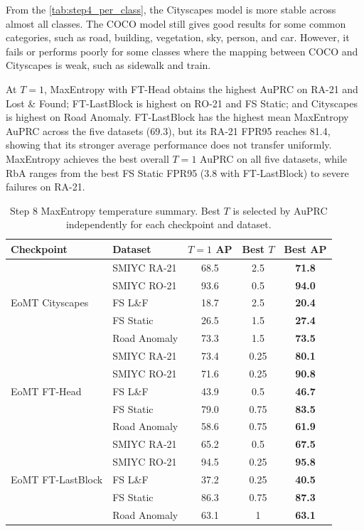 \documentclass[10pt,twocolumn,letterpaper]{article}
\begin{document}
From the \cref{tab:step4_per_class}, the Cityscapes model is more stable across almost all classes. The COCO model still gives good results for some common categories, such as road, building, vegetation, sky, person, and car. However, it fails or performs poorly for some classes where the mapping between COCO and Cityscapes is weak, such as sidewalk and train.

At $T=1$, MaxEntropy with FT-Head obtains the highest AuPRC on RA-21 and Lost \& Found; FT-LastBlock is highest on RO-21 and FS Static; and Cityscapes is highest on Road Anomaly. FT-LastBlock has the highest mean MaxEntropy AuPRC across the five datasets (69.3), but its RA-21 FPR95 reaches 81.4, showing that its stronger average performance does not transfer uniformly. MaxEntropy achieves the best overall $T=1$ AuPRC on all five datasets, while RbA ranges from the best FS Static FPR95 (3.8 with FT-LastBlock) to severe failures on RA-21.

\begin{table}[t]
\centering
\caption{Step 8 MaxEntropy temperature summary. Best $T$ is selected by AuPRC independently for each checkpoint and dataset.}
\label{tab:temperature_results}
\setlength{\tabcolsep}{3pt}
\scriptsize
\begin{tabular}{llccc}
\toprule
Checkpoint & Dataset & $T{=}1$ AP & Best $T$ & Best AP \\
\midrule
 & SMIYC RA-21 & 68.5 & 2.5 & \textbf{71.8} \\
 & SMIYC RO-21 & 93.6 & 0.5 & \textbf{94.0} \\
 EoMT Cityscapes & FS L\&F & 18.7 & 2.5 & \textbf{20.4} \\
 & FS Static & 26.5 & 1.5 & \textbf{27.4} \\
 & Road Anomaly & 73.3 & 1.5 & \textbf{73.5} \\
\midrule
 & SMIYC RA-21 & 73.4 & 0.25 & \textbf{80.1} \\
 & SMIYC RO-21 & 71.6 & 0.25 & \textbf{90.8} \\
 EoMT FT-Head & FS L\&F & 43.9 & 0.5 & \textbf{46.7} \\
 & FS Static & 79.0 & 0.75 & \textbf{83.5} \\
 & Road Anomaly & 58.6 & 0.75 & \textbf{61.9} \\
\midrule
 & SMIYC RA-21 & 65.2 & 0.5 & \textbf{67.5} \\
 & SMIYC RO-21 & 94.5 & 0.25 & \textbf{95.8} \\
 EoMT FT-LastBlock & FS L\&F & 37.2 & 0.25 & \textbf{40.5} \\
 & FS Static & 86.3 & 0.75 & \textbf{87.3} \\
 & Road Anomaly & 63.1 & 1 & \textbf{63.1} \\
\bottomrule
\end{tabular}
\end{table}
\end{document}
